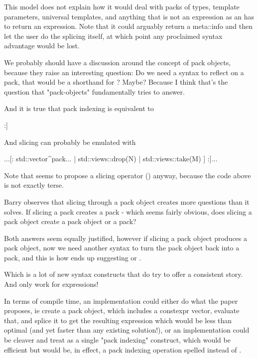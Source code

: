 \documentclass{wg21}
\begin{document}
This model does not explain how it would deal with packs of types, template parameters, universal templates, and anything that is not an expression as an 
has to return an expression.
Note that it could arguably return a meta::info and then let the user do the splicing itself, at which point any proclaimed syntax advantage would be lost.

We probably should have a discussion around the concept of pack objects, because they raise an interesting question:
Do we need a syntax to reflect on a pack, that would be a shorthand for ? Maybe?
Because I think that's the question that "pack-objects" fundamentally tries to answer.

And it is true that pack indexing is equivalent to
\begin{colorblock}
 [: std::vector{^pack...}[N] :]
\end{colorblock}

And slicing can probably be emulated with

\begin{colorblock}
...[: std::vector{^pack...} | std::views::drop(N) | std::views::take(M) ] :]...
\end{colorblock}

Note that  seems to propose a slicing operator () anyway,
because the code above is not exactly terse.

Barry observes that slicing through a pack object creates more questions than it solves.
If slicing a pack creates a pack - which seems fairly obvious, does slicing a pack object create a pack object or a pack?

Both answers seem equally justified, however if slicing a pack object produces a pack object, now we need another syntax
to turn the pack object back into a pack, and this is how 
ends up suggesting  or .

Which is a lot of new syntax constructs that do try to offer a consistent story.
And only work for expressions!

In terms of compile time, an implementation could either do what the paper proposes,
ie create a pack object, which includes a constexpr vector, evaluate that, and splice it to get the resulting expression
which would be less than optimal (and yet faster than any existing solution!), or an implementation
could be cleaver and treat \tcode{![N]} as a single "pack indexing" construct, which would be efficient but would be, in effect,
a pack indexing operation spelled \tcode{![]} instead of .
\end{document}
